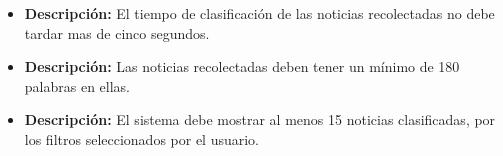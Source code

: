 


    \begin{itemize}
      \item \textbf{Descripción:} El tiempo de clasificación de las noticias recolectadas no debe tardar mas de cinco segundos.\\
    \end{itemize}

    \begin{itemize}
     \item \textbf{Descripción:} Las noticias recolectadas deben tener un mínimo de 180 palabras en ellas.\\
    \end{itemize}

    \begin{itemize}
      \item \textbf{Descripción:} El sistema debe mostrar al menos 15 noticias clasificadas, por los filtros seleccionados
      por el usuario.\\
    \end{itemize}

